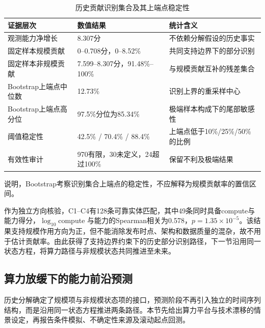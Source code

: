 \documentclass[bwprint]{gmcmthesis}
\newcommand{\CompactTableSetup}{%
    \centering
    \normalsize
    \setlength{\tabcolsep}{4pt}%
    \renewcommand{\arraystretch}{1.08}%
}
\newcommand{\TableNote}[2][0.96\textwidth]{%
    \vspace{0.25em}\par
    \begin{minipage}{#1}
    \normalsize\raggedright #2
    \end{minipage}
}
\begin{document}
\begin{table}[htbp]
    \caption{历史贡献识别集合及其上端点稳定性}
    \label{tab:q4-contribution-stability}
    \CompactTableSetup
    \setlength{\tabcolsep}{3.5pt}
    \begin{tabular}{@{}P{4.60cm}C{4.60cm}C{5.20cm}@{}}
        \toprule
        证据层次            & 数值结果                         & 统计含义                   \\
        \midrule
        观测能力净增长         & 8.307分                       & 不依赖分解假设的历史事实           \\
        固定样本规模贡献        & 0--0.708分，0--8.52\%          & 共同支持边界下的部分识别           \\
        固定样本非规模贡献       & 7.599--8.307分，91.48\%--100\% & 与规模贡献互补的残差集合           \\
        Bootstrap上端点中位数 & 12.73\%                      & 识别上界的重采样中心             \\
        Bootstrap上端点高分位 & 97.5\%分位为85.34\%             & 极端样本构成下的尾部敏感性          \\
        阈值稳定性           & 42.5\% / 70.4\% / 88.4\%     & 上端点低于10\%/25\%/50\%的比例 \\
        有效性审计           & 970有限，30未定义，24超过100\%        & 保留不利及极端结果              \\
        \bottomrule
    \end{tabular}
    \TableNote[\textwidth]{\quad\quad \footnotesize{说明，Bootstrap考察识别集合上端点的稳定性，不应解释为规模贡献率的置信区间。}}
\end{table}

作为独立方向核验，C1--C4有128条可靠实体匹配，其中49条同时具备compute与能力得分，$\log_{10}$compute 与能力的Spearman相关为0.578，$p=1.35\times10^{-5}$。该结果支持规模作用方向为正，但不能消除发布时点、架构和数据质量的混杂，故不用于估计贡献率。由此获得了支持边界约束下的历史部分识别路径，下一节沿用同一状态方程，将算力路径与非规模状态共同推进至未来。

\subsection{算力放缓下的能力前沿预测}

历史分解确定了规模项与非规模状态项的接口，预测阶段不再引入独立的时间序列结构，而是沿用同一状态方程推进两条路径。本节先给出算力平台与技术漂移的情景设定，再报告条件模拟、不确定性来源及滚动起点回测。
\end{document}
